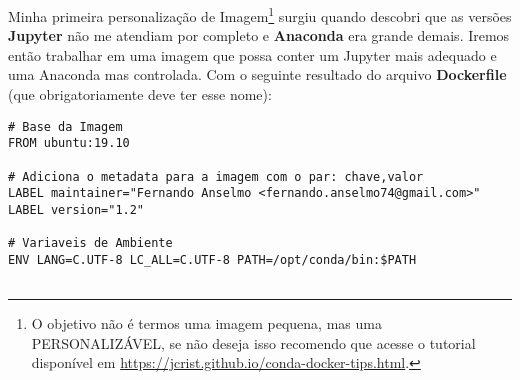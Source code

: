 Minha primeira personalização de Imagem\footnote{O objetivo não é termos uma imagem pequena, mas uma PERSONALIZÁVEL, se não deseja isso recomendo que acesse o tutorial disponível em \url{https://jcrist.github.io/conda-docker-tips.html}.} surgiu quando descobri que as versões \textbf{Jupyter} não me atendiam por completo e \textbf{Anaconda} era grande demais. Iremos então trabalhar em uma imagem que possa conter um Jupyter mais adequado e uma Anaconda mas controlada. Com o seguinte resultado do arquivo \textbf{Dockerfile} (que obrigatoriamente deve ter esse nome):
\begin{lstlisting}[]
# Base da Imagem
FROM ubuntu:19.10

# Adiciona o metadata para a imagem com o par: chave,valor
LABEL maintainer="Fernando Anselmo <fernando.anselmo74@gmail.com>"
LABEL version="1.2"

# Variaveis de Ambiente
ENV LANG=C.UTF-8 LC_ALL=C.UTF-8 PATH=/opt/conda/bin:$PATH


\end{lstlisting}
